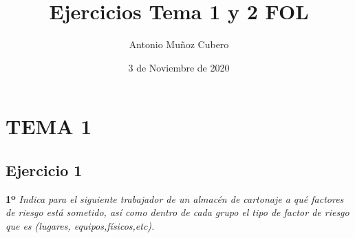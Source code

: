 \documentclass{article}
\title{Ejercicios Tema 1 y 2 FOL}
\author{Antonio Muñoz Cubero}
\date{3 de Noviembre de 2020}
\begin{document}
  \maketitle
    \tableofcontents

  \newpage
    \section{TEMA 1}
      \subsection{Ejercicio 1}
        \textbf{1º} \textit{Indica para el siguiente trabajador de un almacén de cartonaje a qué factores de riesgo está sometido, así como dentro de cada grupo el tipo de factor de riesgo que es (lugares, equipos,físicos,etc).}
        \\
\end{document}
